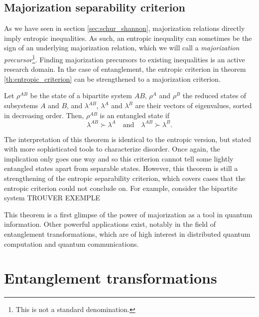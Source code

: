 \subsection{Majorization separability criterion} \label{sec:majorization_separability_criterion}

As we have seen in section \ref{sec:schur_shannon}, majorization relations directly imply entropic inequalities. As such, an entropic inequality can sometimes be the sign of an underlying majorization relation, which we will call a \textit{majorization precursor}\footnote{This is not a standard denomination.}. Finding majorization precursors to existing inequalities is an active research domain. In the case of entanglement, the entropic criterion in theorem \ref{th:entropic_criterion} can be strengthened to a majorization criterion.

\begin{theorem} \label{th:majorization_separability_criterion}
    Let $\rho^{AB}$ be the state of a bipartite system $AB$, $\rho^A$ and $\rho^B$ the reduced states of subsystems $A$ and $B$, and $\lambda^{AB}$, $\lambda^A$ and $\lambda^B$ are their vectors of eigenvalues, sorted in decreasing order. Then, $\rho^{AB}$ is an entangled state if 
    \begin{equation}
        \lambda^{AB} \succ \lambda^A \quad \text{and} \quad \lambda^{AB} \succ \lambda^B.
    \end{equation}
\end{theorem}

The interpretation of this theorem is identical to the entropic version, but stated with more sophisticated tools to characterize disorder. Once again, the implication only goes one way and so this criterion cannot tell some lightly entangled states apart from separable states. However, this theorem is still a strengthening of the entropic separability criterion, which covers cases that the entropic criterion could not conclude on. For example, consider the bipartite system TROUVER EXEMPLE

This theorem is a first glimpse of the power of majorization as a tool in quantum information. Other powerful applications exist, notably in the field of entanglement transformations, which are of high interest in distributed quantum computation and quantum communications.



\section{Entanglement transformations}

